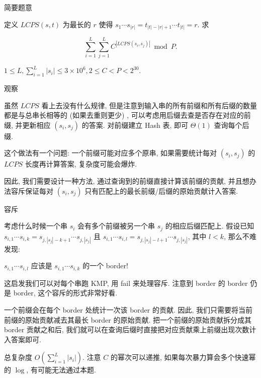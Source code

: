 \begin{frame}{简要题意}
	
	定义 $LCPS\left(s, t\right)$ 为最长的 $r$ 使得 $s_1 \cdots s_{|r|} = t_{|t| - |r| + 1} \cdots t_{|t|} = r$. 求

	$$\sum_{i=1}^L \sum_{j=1}^L C^{\left|LCPS\left(s_i, s_j\right)\right|} \bmod{P}.$$

	$1\le L, \sum_{i=1}^L \left|s_i\right|\le 3\times 10^6, 2\le C < P < 2^{30}$.

\end{frame}

\begin{frame}{观察}
	
	虽然 $LCPS$ 看上去没有什么规律, 但是注意到输入串的所有前缀和所有后缀的数量都是与总串长相等的 (如果去重则更少) , 可以考虑用后缀去查是否存在对应的前缀, 并更新相应 $\left(s_i, s_j\right)$ 的答案. 对前缀建立 Hash 表, 即可 $\Theta(1)$ 查询每个后缀. \pause

	这个做法有一个问题: 一个前缀可能对应多个原串, 如果需要统计每对 $\left(s_i, s_j\right)$ 的 $LCPS$ 长度再计算答案, 复杂度可能会爆炸. \pause

	因此, 我们需要设计一种方法, 通过查询到的前缀直接计算该前缀的贡献, 并且想办法容斥保证每对 $\left(s_i, s_j\right)$ 只有匹配上的最长前缀/后缀的原始贡献计入答案. 

\end{frame}

\begin{frame}{容斥}
	
	考虑什么时候一个串 $s_i$ 会有多个前缀被另一个串 $s_j$ 的相应后缀匹配上. 假设已知 $s_{i,1}\cdots s_{i,k} = s_{j,\left|s_j\right|-k+1}\cdots s_{j, \left|s_j\right|}$ 且 $s_{i,1}\cdots s_{i,l} = s_{j,\left|s_j\right|-l+1}\cdots s_{j, \left|s_j\right|}$, 
	其中 $l<k$, 那么不难发现:\pause

	$s_{i,1}\cdots s_{i,l}$ 应该是 $s_{i,1}\cdots s_{i,k}$ 的一个 border!\pause

	这启发我们可以对每个串跑 KMP, 用 fail 来处理容斥. 注意到 border 的 border 仍是 border, 这个容斥的形式非常好看. \pause

	一个前缀会在每个 border 处统计一次该 border 的贡献. 因此, 我们只需要将当前前缀的原始贡献减去其最长 border 的原始贡献. 把一个前缀的原始贡献拆分成其 border 贡献之和后, 我们就可以在查询后缀时直接把对应贡献乘上前缀出现次数计入答案即可. \pause
	
	总复杂度 $O\left(\sum_{i=1}^L \left|s_i\right|\right)$. 注意 $C$ 的幂次可以递推, 如果每次暴力算会多个快速幂的 $\log$, 有可能无法通过本题. 

\end{frame}